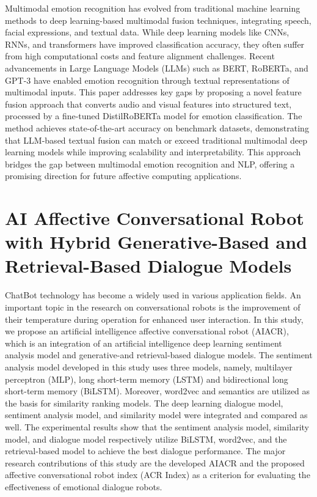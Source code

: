 \hspace*{17pt}Multimodal emotion recognition has evolved from traditional machine learning methods to deep learning-based multimodal fusion techniques, integrating speech, facial expressions, and textual data. While deep learning models like CNNs, RNNs, and transformers have improved classification accuracy, they often suffer from high computational costs and feature alignment challenges. Recent advancements in Large Language Models (LLMs) such as BERT, RoBERTa, and GPT-3 have enabled emotion recognition through textual representations of multimodal inputs. This paper addresses key gaps by proposing a novel feature fusion approach that converts audio and visual features into structured text, processed by a fine-tuned DistilRoBERTa model for emotion classification. The method achieves state-of-the-art accuracy on benchmark datasets, demonstrating that LLM-based textual fusion can match or exceed traditional multimodal deep learning models while improving scalability and interpretability. This approach bridges the gap between multimodal emotion recognition and NLP, offering a promising direction for future affective computing applications.
\


\newpage
\section[AI Affective Conversational Robot with Hybrid Generative-Based and Retrieval-Based Dialogue Models]{AI Affective Conversational Robot with Hybrid Generative-Based and Retrieval-Based Dialogue Models \cite{paper_3}}
\hspace*{17pt} ChatBot technology has become a widely used in various application fields. An important topic in the research on conversational robots is the improvement of their temperature during operation for enhanced user interaction. In this study, we propose an artificial intelligence affective conversational robot (AIACR), which is an integration of an artificial intelligence deep learning sentiment analysis model and generative-and retrieval-based dialogue models. The sentiment analysis model developed in this study uses three models, namely, multilayer perceptron (MLP), long short-term memory (LSTM) and bidirectional long short-term memory (BiLSTM). Moreover, word2vec and semantics are utilized as the basis for similarity ranking models. The deep learning dialogue model, sentiment analysis model, and similarity model were integrated and compared as well. The experimental results show that the sentiment analysis model, similarity model, and dialogue model respectively utilize BiLSTM, word2vec, and the retrieval-based model to achieve the best dialogue performance. The major research contributions of this study are the developed AIACR and the proposed affective conversational robot index (ACR Index) as a criterion for evaluating the effectiveness of emotional dialogue robots.\

